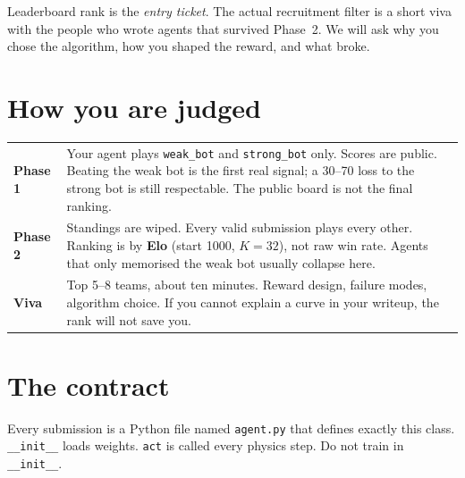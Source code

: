 \documentclass[11pt,a4paper]{article}
\begin{document}
Leaderboard rank is the \emph{entry ticket}. The actual recruitment filter is a short viva with the people who wrote agents that survived Phase~2. We will ask why you chose the algorithm, how you shaped the reward, and what broke.

\section{How you are judged}

\begin{center}
\end{center}

\vspace{0.4em}
\begin{tabularx}{\textwidth}{@{}>{\sffamily\bfseries\color{navy}}p{2.4cm} X@{}}
Phase 1 & Your agent plays \texttt{weak\_bot} and \texttt{strong\_bot} only. Scores are public. Beating the weak bot is the first real signal; a 30--70 loss to the strong bot is still respectable. The public board is not the final ranking. \\[0.45em]
Phase 2 & Standings are wiped. Every valid submission plays every other. Ranking is by \textbf{Elo} (start 1000, $K=32$), not raw win rate. Agents that only memorised the weak bot usually collapse here. \\[0.45em]
Viva & Top 5--8 teams, about ten minutes. Reward design, failure modes, algorithm choice. If you cannot explain a curve in your writeup, the rank will not save you. \\
\end{tabularx}

\section{The contract}

Every submission is a Python file named \texttt{agent.py} that defines exactly this class. \texttt{\_\_init\_\_} loads weights. \texttt{act} is called every physics step. Do not train in \texttt{\_\_init\_\_}.
\end{document}
